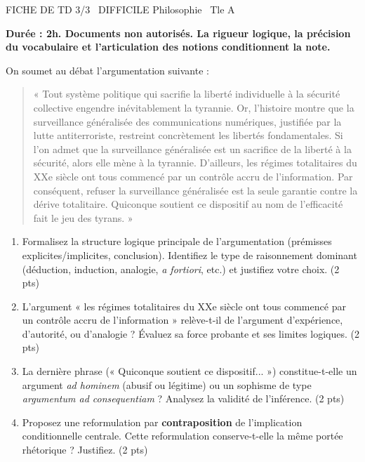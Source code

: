 \documentclass[11pt]{article}
\begin{document}
\pagestyle{empty}

\begin{tcolorbox}[enhanced,colback=popink,colframe=popink,arc=10pt,boxrule=0pt,left=12pt,right=12pt,top=9pt,bottom=9pt]
{\color{white}\popxbold\small FICHE DE TD 3/3 \textbullet\ DIFFICILE \hfill Philosophie \textbullet\ Tle A\par}
\end{tcolorbox}
\vspace{4pt}

\textbf{Durée : 2h. Documents non autorisés. La rigueur logique, la précision du vocabulaire et l'articulation des notions conditionnent la note.}

\begin{exercice}
On soumet au débat l'argumentation suivante : 
\begin{quote}
« Tout système politique qui sacrifie la liberté individuelle à la sécurité collective engendre inévitablement la tyrannie. Or, l'histoire montre que la surveillance généralisée des communications numériques, justifiée par la lutte antiterroriste, restreint concrètement les libertés fondamentales. Si l'on admet que la surveillance généralisée est un sacrifice de la liberté à la sécurité, alors elle mène à la tyrannie. D'ailleurs, les régimes totalitaires du XXe siècle ont tous commencé par un contrôle accru de l'information. Par conséquent, refuser la surveillance généralisée est la seule garantie contre la dérive totalitaire. Quiconque soutient ce dispositif au nom de l'efficacité fait le jeu des tyrans. »
\end{quote}
\begin{enumerate}
    \item Formalisez la structure logique principale de l'argumentation (prémisses explicites/implicites, conclusion). Identifiez le type de raisonnement dominant (déduction, induction, analogie, \textit{a fortiori}, etc.) et justifiez votre choix. (2 pts)
    \item L'argument « les régimes totalitaires du XXe siècle ont tous commencé par un contrôle accru de l'information » relève-t-il de l'argument d'expérience, d'autorité, ou d'analogie ? Évaluez sa force probante et ses limites logiques. (2 pts)
    \item La dernière phrase (« Quiconque soutient ce dispositif... ») constitue-t-elle un argument \textit{ad hominem} (abusif ou légitime) ou un sophisme de type \textit{argumentum ad consequentiam} ? Analysez la validité de l'inférence. (2 pts)
    \item Proposez une reformulation par \textbf{contraposition} de l'implication conditionnelle centrale. Cette reformulation conserve-t-elle la même portée rhétorique ? Justifiez. (2 pts)
\end{enumerate}
\end{exercice}
\end{document}
